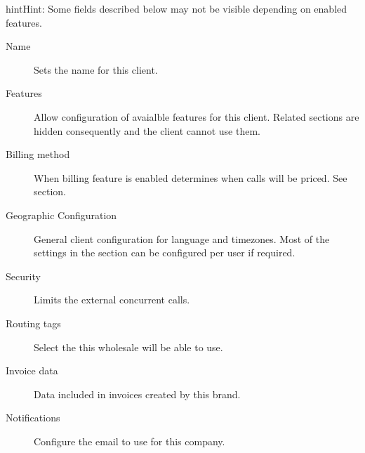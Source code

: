 \documentclass[letterpaper,10pt,english]{sphinxmanual}
\begin{document}
\begin{notice}{hint}{Hint:}
Some fields described below may not be visible depending on enabled features.
\end{notice}
\begin{description}
\item[{Name}] \leavevmode{}\label{brand/wholesale:term-name}
Sets the name for this client.

\item[{Features}] \leavevmode{}\label{brand/wholesale:term-features}
Allow configuration of avaialble features for this client.
Related sections are hidden consequently and the client cannot use them.

\item[{Billing method}] \leavevmode{}\label{brand/wholesale:term-billing-method}
When billing feature is enabled determines when calls will be priced. See {\hyperref[brand/billing/index:billing]{}} section.

\item[{Geographic Configuration}] \leavevmode{}\label{brand/wholesale:term-geographic-configuration}
General client configuration for language and timezones. Most of the settings in the section can be
configured per user if required.

\item[{Security}] \leavevmode{}\label{brand/wholesale:term-security}
Limits the external concurrent calls.

\item[{Routing tags}] \leavevmode{}\label{brand/wholesale:term-routing-tags}
Select the {\hyperref[brand/routing/routing_tags:routing\string-tags]{}} this wholesale will be able to use.

\item[{Invoice data}] \leavevmode{}\label{brand/wholesale:term-invoice-data}
Data included in invoices created by this brand.

\item[{Notifications}] \leavevmode{}\label{brand/wholesale:term-notifications}
Configure the email {\hyperref[brand/notifications:notification\string-templates]{}} to use for this company.


\end{description}
\end{document}
